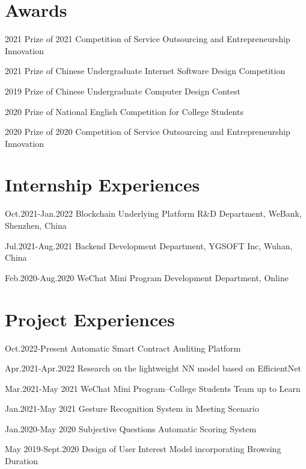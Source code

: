 \documentclass[12pt,letterpaper]{report}
\begin{document}
    \section*{Awards}
    \begin{tablist}
        \item[2021] \tab{} Prize of 2021 Competition of Service Outsourcing and Entrepreneurship Innovation
        \item[2021] \tab{} Prize of Chinese Undergraduate Internet Software Design Competition
        \item[2019] \tab{} Prize of Chinese Undergraduate Computer Design Contest
        \item[2020] \tab{} Prize of National English Competition for College Students
        \item[2020] \tab{} Prize of 2020 Competition of Service Outsourcing and Entrepreneurship Innovation
    \end{tablist}

    \section*{Internship Experiences}
    \begin{tablist}
        \item[Oct.2021-Jan.2022] \tab{}Blockchain Underlying Platform R\&D Department, WeBank, Shenzhen, China
        \item[Jul.2021-Aug.2021] \tab{}Backend Development Department, YGSOFT Inc, Wuhan, China
        \item[Feb.2020-Aug.2020] \tab{}WeChat Mini Program Development Department, Online 
    \end{tablist}

    \section*{Project Experiences}
    \begin{tablist}
        \item[Oct.2022-Present] \tab{}Automatic Smart Contract Auditing Platform
        \item[Apr.2021-Apr.2022] \tab{}Research on the lightweight NN model based on EfficientNet
        \item[Mar.2021-May 2021] \tab{}WeChat Mini Program--College Students Team up to Learn
        \item[Jan.2021-May 2021] \tab{}Gesture Recognition System in Meeting Scenario
        \item[Jan.2020-May 2020] \tab{}Subjective Questions Automatic Scoring System
        \item[May 2019-Sept.2020] Design of User Interest Model incorporating Browsing Duration
    \end{tablist}
\end{document}
